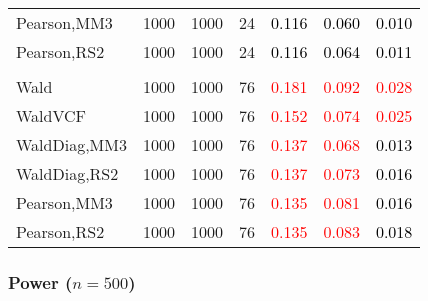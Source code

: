 \documentclass[
]{article}
\begin{document}
\begin{table}[H]
{\begin{tabular}[t]{lrrrrrr}
\hspace{1em}Pearson,MM3 & 1000 & 1000 & 24 & \textcolor{black}{0.116} & \textcolor{black}{0.060} & \textcolor{black}{0.010}\\
\hspace{1em}Pearson,RS2 & 1000 & 1000 & 24 & \textcolor{black}{0.116} & \textcolor{black}{0.064} & \textcolor{black}{0.011}\\
\addlinespace[0.3em]
\multicolumn{7}{l}{\textbf{3F 15V}}\\
\hspace{1em}Wald & 1000 & 1000 & 76 & \textcolor{red}{0.181} & \textcolor{red}{0.092} & \textcolor{red}{0.028}\\
\hspace{1em}WaldVCF & 1000 & 1000 & 76 & \textcolor{red}{0.152} & \textcolor{red}{0.074} & \textcolor{red}{0.025}\\
\hspace{1em}WaldDiag,MM3 & 1000 & 1000 & 76 & \textcolor{red}{0.137} & \textcolor{red}{0.068} & \textcolor{black}{0.013}\\
\hspace{1em}WaldDiag,RS2 & 1000 & 1000 & 76 & \textcolor{red}{0.137} & \textcolor{red}{0.073} & \textcolor{black}{0.016}\\
\hspace{1em}Pearson,MM3 & 1000 & 1000 & 76 & \textcolor{red}{0.135} & \textcolor{red}{0.081} & \textcolor{black}{0.016}\\
\hspace{1em}Pearson,RS2 & 1000 & 1000 & 76 & \textcolor{red}{0.135} & \textcolor{red}{0.083} & \textcolor{black}{0.018}\\
\bottomrule
\end{tabular}}
\endgroup{}
\end{table}

\hypertarget{power-n500-2}{%
\subsubsection{\texorpdfstring{Power
(\(n=500\))}{Power (n=500)}}\label{power-n500-2}}
\end{document}

